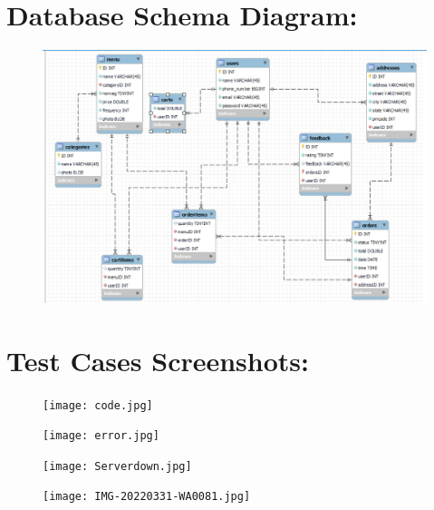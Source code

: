 \documentclass{scrreprt}
\begin{document}
\section*{Database Schema Diagram:}
\begin{figure}[h!]
    \centering
    \includegraphics[scale=0.4]{Class_diagram.jpg}
    
\end{figure}
\newpage
\section*{Test Cases Screenshots:}
\begin{figure}[h!]
    \centering
    \texttt{[image: code.jpg]}
    
\end{figure}
\begin{figure}[h!]
    \centering
    \texttt{[image: error.jpg]}
    
\end{figure}
\begin{figure}[h!]
    \centering
    \texttt{[image: Serverdown.jpg]}
    
\end{figure}
\begin{figure}[h!]
    \centering
    \texttt{[image: IMG-20220331-WA0081.jpg]}
    
\end{figure}
\end{document}
